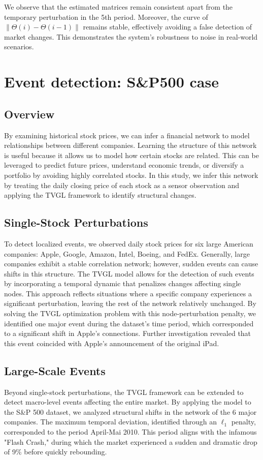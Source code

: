 \documentclass{article}
\begin{document}
We observe that the estimated matrices remain consistent apart from the temporary perturbation in the 5th period. Moreover, the curve of \(\|\Theta(i) - \Theta(i-1)\|\) remains stable, effectively avoiding a false detection of market changes. This demonstrates the system's robustness to noise in real-world scenarios.

 \section{Event detection: S\&P500 case}


\subsection{Overview}
By examining historical stock prices, we can infer a financial network to model relationships between different companies. Learning the structure of this network is useful because it allows us to model how certain stocks are related. This can be leveraged to predict future prices, understand economic trends, or diversify a portfolio by avoiding highly correlated stocks. In this study, we infer this network by treating the daily closing price of each stock as a sensor observation and applying the TVGL framework to identify structural changes.

\subsection{Single-Stock Perturbations}
To detect localized events, we observed daily stock prices for six large American companies: Apple, Google, Amazon, Intel, Boeing, and FedEx. Generally, large companies exhibit a stable correlation network; however, sudden events can cause shifts in this structure. The TVGL model allows for the detection of such events by incorporating a temporal dynamic that penalizes changes affecting single nodes. This approach reflects situations where a specific company experiences a significant perturbation, leaving the rest of the network relatively unchanged. By solving the TVGL optimization problem with this node-perturbation penalty, we identified one major event during the dataset's time period, which corresponded to a significant shift in Apple's connections. Further investigation revealed that this event coincided with Apple's announcement of the original iPad.

\subsection{Large-Scale Events}
 Beyond single-stock perturbations, the TVGL framework can be extended to detect macro-level events affecting the entire market. By applying the model to the S\&P 500 dataset, we analyzed structural shifts in the network of the 6 major companies. The maximum temporal deviation, identified through an $\ell_1$ penalty, corresponded to the period April-Mai 2010. This period aligns with the infamous "Flash Crash," during which the market experienced a sudden and dramatic drop of 9\% before quickly rebounding. 
\end{document}
